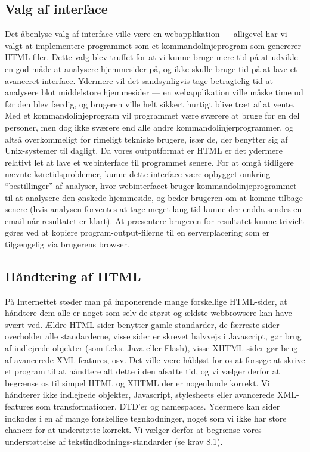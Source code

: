 \documentclass[a4paper,oneside,article, titlepage]{article}
\begin{document}
\subsection{Valg af interface}
Det åbenlyse valg af interface ville være en webapplikation ---
alligevel har vi valgt at implementere programmet som et
kommandolinjeprogram som genererer HTML-filer. Dette valg blev truffet
for at vi kunne bruge mere tid på at udvikle en god måde at analysere
hjemmesider på, og ikke skulle bruge tid på at lave et avanceret
interface. Ydermere vil det sandsynligvis tage betragtelig tid at
analysere blot middelstore hjemmesider --- en webapplikation ville måske
time ud før den blev færdig, og brugeren ville helt sikkert hurtigt
blive træt af at vente. Med et kommandolinjeprogram vil programmet
være sværere at bruge for en del personer, men dog ikke sværere end
alle andre kommandolinjerprogrammer, og altså overkommeligt for
rimeligt tekniske brugere, især de, der benytter sig af Unix-systemer
til dagligt. Da vores outputformat er HTML er det ydermere relativt
let at lave et webinterface til programmet senere. For at omgå
tidligere nævnte køretidsproblemer, kunne dette interface være
opbygget omkring ``bestillinger'' af analyser, hvor webinterfacet
bruger kommandolinjeprogrammet til at analysere den ønskede
hjemmeside, og beder brugeren om at komme tilbage senere (hvis
analysen forventes at tage meget lang tid kunne der endda sendes en
email når resultatet er klart). At præsentere brugeren for resultatet
kunne trivielt gøres ved at kopiere program-output-filerne til en
serverplacering som er tilgængelig via brugerens browser.

\subsection{Håndtering af HTML}
På Internettet støder man på imponerende mange forskellige HTML-sider,
at håndtere dem alle er noget som selv de størst og ældste webbrowsere
kan have svært ved. Ældre HTML-sider benytter gamle standarder, de
færreste sider overholder alle standarderne, visse sider er skrevet
halvvejs i Javascript, gør brug af indlejrede objekter (som
f.eks. Java eller Flash), visse XHTML-sider gør brug af avancerede
XML-features, osv. Det ville være håbløst for os at forsøge at skrive
et program til at håndtere alt dette i den afsatte tid, og vi vælger
derfor at begrænse os til simpel HTML og XHTML der er nogenlunde
korrekt. Vi håndterer ikke indlejrede objekter, Javascript,
stylesheets eller avancerede XML-features som transformationer, DTD'er
og namespaces. Ydermere kan sider indkodes i en af mange forskellige
tegnkodninger, noget som vi ikke har store chancer for at understøtte
korrekt. Vi vælger derfor at begrænse vores understøttelse af
tekstindkodnings-standarder (se krav 8.1).
\end{document}
